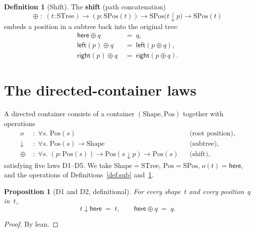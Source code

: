 \documentclass[11pt,a4paper]{article}
\theoremstyle{plain}
\newtheorem{proposition}[theorem]{Proposition}
\theoremstyle{definition}
\newtheorem{definition}[theorem]{Definition}
\newcommand{\STree}{\mathrm{STree}}
\newcommand{\SPos}{\mathrm{SPos}}
\begin{document}
\begin{definition}[Shift]\label{def:shift}
The \textbf{shift} (path concatenation)
\begin{equation}
  \oplus \;:\;
  (t : \STree) \to
  (p : \SPos(t)) \to
  \SPos\bigl(t \mathbin{\downarrow} p\bigr) \to
  \SPos(t)
\end{equation}
embeds a position in a subtree back into the original tree:
\begin{align}
  \mathsf{here} \oplus q
  &\;=\; q, \\
  \mathsf{left}(p) \oplus q
  &\;=\; \mathsf{left}(p \oplus q), \\
  \mathsf{right}(p) \oplus q
  &\;=\; \mathsf{right}(p \oplus q).
\end{align}
\end{definition}

\section{The directed-container laws}

A directed container consists of a container $(\mathrm{Shape}, \mathrm{Pos})$
together with operations
\begin{align}
  o &\;:\; \forall s.\; \mathrm{Pos}(s)
  &&\text{(root position)}, \\
  {\mathord{\downarrow}} &\;:\; \forall s.\; \mathrm{Pos}(s) \to \mathrm{Shape}
  &&\text{(subtree)}, \\
  {\oplus} &\;:\;
  \forall s.\;
  (p : \mathrm{Pos}(s)) \to
  \mathrm{Pos}(s \mathbin{\downarrow} p) \to
  \mathrm{Pos}(s)
  &&\text{(shift)},
\end{align}
satisfying five laws D1--D5. We take $\mathrm{Shape} = \STree$,
$\mathrm{Pos} = \SPos$, $o(t) = \mathsf{here}$, and the operations of
Definitions~\ref{def:sub} and~\ref{def:shift}.

\begin{proposition}[D1 and D2, definitional]\label{prop:d1-d2}
For every shape~$t$ and every position~$q$ in~$t$,
\begin{equation}
  t \mathbin{\downarrow} \mathsf{here} \;=\; t,
  \qquad
  \mathsf{here} \oplus q \;=\; q.
\end{equation}
\end{proposition}

\begin{proof}
By lean.
\end{proof}
\end{document}
